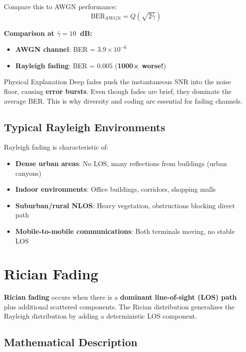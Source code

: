 Compare this to AWGN performance:
\begin{equation}
\text{BER}_{\text{AWGN}} = Q\left(\sqrt{2\bar{\gamma}}\right)
\end{equation}

\textbf{Comparison at $\bar{\gamma} = 10$~dB:}
\begin{itemize}
\item \textbf{AWGN channel}: BER = $3.9 \times 10^{-6}$
\item \textbf{Rayleigh fading}: BER = $0.005$ (\textbf{1000× worse!})
\end{itemize}

\begin{calloutbox}{Physical Explanation}
Deep fades push the instantaneous SNR into the noise floor, causing \textbf{error bursts}. Even though fades are brief, they dominate the average BER. This is why diversity and coding are essential for fading channels.
\end{calloutbox}

\subsection{Typical Rayleigh Environments}

Rayleigh fading is characteristic of:
\begin{itemize}
\item \textbf{Dense urban areas}: No LOS, many reflections from buildings (urban canyons)
\item \textbf{Indoor environments}: Office buildings, corridors, shopping malls
\item \textbf{Suburban/rural NLOS}: Heavy vegetation, obstructions blocking direct path
\item \textbf{Mobile-to-mobile communications}: Both terminals moving, no stable LOS
\end{itemize}

\section{Rician Fading}

\textbf{Rician fading} occurs when there is a \textbf{dominant line-of-sight (LOS) path} plus additional scattered components. The Rician distribution generalizes the Rayleigh distribution by adding a deterministic LOS component.

\subsection{Mathematical Description}

